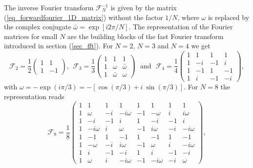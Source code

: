 The inverse Fourier transform $\mathcal{F}^{-1}_{N}$ is given by the 
matrix ({\ref{eq_forwardfourier_1D_matrix}}) without the factor
$1/N$, where $\omega$ is replaced by the complex conjugate 
$\bar{\omega} = \exp \left[i 2 \pi/N \right]$. The representation of 
the Fourier matrices for small $N$ are the building 
blocks of the fast Fourier transform introduced in section (\ref{sec_fft}).   
For $N = 2$, $N = 3$ and $N = 4$ we get
\begin{equation} \label{eq_F2F3}
 \mathcal{F}_{2}
  =
 \frac{1}{2}
 \left(
  \begin{array}{cr}
     1  &  1 
        \\
     1  &  -1 
  \end{array}
 \right),
 \ \ 
 \mathcal{F}_{3}
  =
 \frac{1}{3}
 \left(
  \begin{array}{ccc}
     1    &    1         &    1
              \\
     1    & \omega       &  \bar{\omega}
              \\
     1    & \bar{\omega} &  \omega 
  \end{array}
 \right)
\ \ \ \mbox{and} \ \ \ 
 \mathcal{F}_{4}
  =
 \frac{1}{4}
 \left(
  \begin{array}{crrr}
   1   & 1   &  1  &  1
        \\
   1   & -i  & -1  &  i
        \\
   1   & -1  &  1  & -1
        \\
   1   &  i  & -1  & -i 
  \end{array}
 \right),
\end{equation}
with $\omega = -\exp (i \pi/3)=-[\cos(\pi/3)+i \ \sin(\pi/3)]$. For $N=8$ 
the representation reads     
\begin{equation} \label{eq_F4F8}
 \mathcal{F}_{8}
  =
 \frac{1}{8}
 \left(
  \begin{array}{crrrrrrr}
   1& 1       & 1& 1        & 1&     1   & 1& 1
                                           \\
   1& \omega  &-i&-i\omega  &-1& -\omega & i& i\omega 
                                           \\
   1&-i       &-1& i        & 1& -i      &-1& i
                                           \\ 
   1&-i\omega & i& \omega   &-1&  i\omega&-i&-i\omega
                                           \\  
   1&-1       & 1&-1        & 1& -1      & 1&-1
                                           \\ 
   1&-\omega  &-i& i\omega  &-1&   \omega& i&-i\omega 
                                           \\ 
   1& i       &-1&-i        & 1&  i      &-1&-i 
                                           \\ 
   1&\omega   & i&-i\omega  &-1& -i\omega&-i& \omega 
  \end{array}
 \right),
\end{equation}
